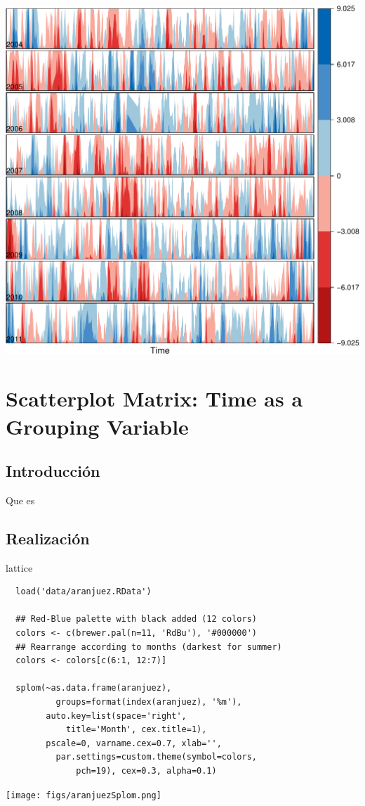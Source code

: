 \documentclass[xcolor={usenames,svgnames,dvipsnames}]{beamer}
\begin{document}
\begin{frame}[label=sec-3-3-4]{}
\includegraphics[width=.9\linewidth]{figs/diffTa_horizon.pdf}
\end{frame}


\section{Scatterplot Matrix: Time as a Grouping Variable}
\label{sec-4}

\subsection{Introducción}
\label{sec-4-1}

\begin{frame}[label=sec-4-1-1]{Que es}
\end{frame}

\subsection{Realización}
\label{sec-4-2}

\begin{frame}[fragile,label=sec-4-2-1]{lattice}
 \lstset{language=R,label= ,caption= ,numbers=none}
\begin{lstlisting}
  load('data/aranjuez.RData')
  
  ## Red-Blue palette with black added (12 colors)
  colors <- c(brewer.pal(n=11, 'RdBu'), '#000000')
  ## Rearrange according to months (darkest for summer)
  colors <- colors[c(6:1, 12:7)]
  
  splom(~as.data.frame(aranjuez),
          groups=format(index(aranjuez), '%m'),
        auto.key=list(space='right', 
            title='Month', cex.title=1),
        pscale=0, varname.cex=0.7, xlab='',
          par.settings=custom.theme(symbol=colors,
              pch=19), cex=0.3, alpha=0.1)
\end{lstlisting}


\texttt{[image: figs/aranjuezSplom.png]}
\end{frame}
\end{document}
